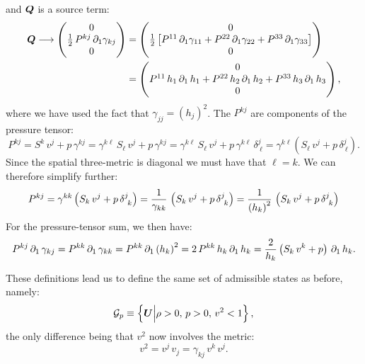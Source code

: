\documentclass[10pt,preprint]{aastex}
\begin{document}
and $\bQ$ is a source term:
\begin{align}
    \bQ\longrightarrow\begin{pmatrix}0\\\f{1}{2}\,P^{kj}\,\pd{\gamma_{kj}}{1}\\0\end{pmatrix}&=\begin{pmatrix}0\\ \f{1}{2}\left[P^{11}\,\pd{\gamma_{11}}{1}+P^{22}\,\pd{\gamma_{22}}{1}+P^{33}\,\pd{\gamma_{33}}{1}\right] \\0\end{pmatrix}\\
    &=\begin{pmatrix}0\\ P^{11}\,h_{1}\,\pd{\,h_{1}}{1}+P^{22}\,h_{2}\,\pd{\,h_{2}}{1}+P^{33}\,h_{3}\,\pd{\,h_{3}}{1} \\0\end{pmatrix},
\end{align}
where we have used the fact that $\gamma_{jj}=\left(h_{j}\right)^{2}$. The $P^{kj}$ are components of the pressure tensor:
\begin{equation}
    P^{kj}=S^{k}\,v^{j}+p\,\gamma^{kj}=\gamma^{k\ell}\,S_{\ell}\,v^{j}+p\,\gamma^{kj}=\gamma^{k\ell}\,S_{\ell}\,v^{j}+p\,\gamma^{k\ell}\,\delta^{j}_{~\ell}=\gamma^{k\ell}\left(S_{\ell}\,v^{j}+p\,\delta^{j}_{~\ell}\right).
\end{equation}
Since the spatial three-metric is diagonal we must have that $\ell=k$. We can therefore simplify further:
\begin{equation}
    P^{kj}=\gamma^{kk}\left(S_{k}\,v^{j}+p\,\delta^{j}_{~k}\right)=\f{1}{\gamma_{kk}}\,\left(S_{k}\,v^{j}+p\,\delta^{j}_{~k}\right)=\f{1}{\left(h_{k}\right)^{2}}\,\left(S_{k}\,v^{j}+p\,\delta^{j}_{~k}\right)
\end{equation}
For the pressure-tensor sum, we then have:
\begin{equation}\label{Eq:PressureTensorSum}
    P^{kj}\,\p_{1}\,\gamma_{kj}=P^{kk}\,\p_{1}\,\gamma_{kk}=P^{kk}\,\p_{1}\left(h_{k}\right)^{2}=2\,P^{kk}\,h_{k}\,\p_{1}\,h_{k}=\f{2}{h_{k}}\left(S_{k}\,v^{k}+p\right)\,\p_{1}\,h_{k}.
\end{equation}

These definitions lead us to define the same set of admissible states as before, namely:
\begin{equation}
    \cG_{p}\equiv\left\{\bU\Big|\rho>0,\,p>0,\,v^{2}<1\right\},
\end{equation}
the only difference being that $v^{2}$ now involves the metric:
\begin{equation}
    v^{2}=v^{j}\,v_{j}=\gamma_{kj}\,v^{k}\,v^{j}.
\end{equation}
\end{document}
